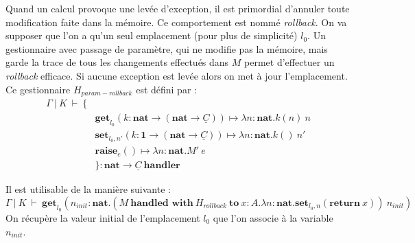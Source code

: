 	Quand un calcul provoque une levée d'exception, il est primordial d'annuler toute modification faite dans la mémoire. Ce comportement est nommé \textit{rollback}. On va supposer que l'on a qu'un seul emplacement (pour plus de simplicité) $l_0$. 
	Un gestionnaire avec passage de paramètre, qui ne modifie pas la mémoire, mais garde la trace de tous les changements effectués dans $M$ permet d'effectuer un \textit{rollback} efficace. Si aucune exception est levée alors on met à jour l'emplacement. Ce gestionnaire $H_{param-rollback}$ est défini par : 
	\begin{align*}
		\Gamma~|~K~\vdash~\{ &\\
		&\textbf{get}_{l_0}(k:\textbf{nat} \rightarrow (\textbf{nat} \rightarrow \underline{C})) \mapsto \lambda n:\textbf{nat}.k(n)~n\\
		&\textbf{set}_{l_0,n'}(k:\textbf{1} \rightarrow (\textbf{nat} \rightarrow \underline{C})) \mapsto \lambda n:\textbf{nat}.k()~n'\\
		&\textbf{raise}_e() \mapsto \lambda n:\textbf{nat}.M'~e\\
		&\} : \textbf{nat} \rightarrow \underline{C}~\textbf{handler}
	\end{align*}
 
 	Il est utilisable de la manière suivante :
 	\[\Gamma~|~K~\vdash~\textbf{get}_{l_0}(n_{init}:\textbf{nat}.(M~\textbf{handled~with}~H_{rollback}~\textbf{to}~x:A.\lambda n:\textbf{nat}.\textbf{set}_{l_0,n}(\textbf{return}~x))~n_{init})\]
 	On récupère la valeur initial de l'emplacement $l_0$ que l'on associe à la variable $n_{init}$.
 	
 	
	
